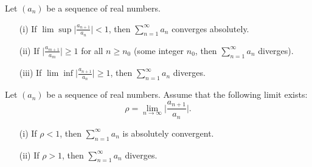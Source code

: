 \documentclass[a4paper]{article}
\begin{document}
\begin{theorem}
    Let \( ({a}_{n}) \) be a sequence of real numbers.
    \begin{enumerate}
        \item[(i)] If \( \lim \sup \Big| \frac{ {a}_{n+1} }{ {a}_{n} }  \Big|  < 1  \), then \( \sum_{ n=1  }^{ \infty  } {a}_{n} \) converges absolutely.
        \item[(ii)] If \( \Big|  \frac{ {a}_{m+1} }{ {a}_{m} }   \Big| \geq 1  \) for all \( n \geq {n}_{0} \) (some integer \( {n}_{0} \), then \( \sum_{ n=1  }^{ \infty  } {a}_{n}\) diverges).
        \item[(iii)] If \( \lim \inf \Big|  \frac{ {a}_{n+1} }{ {a}_{n} }  \Big|  \geq  1  \), then \( \sum_{ n=1  }^{ \infty  } {a}_{n} \) diverges.
    \end{enumerate}
\end{theorem}
\begin{theorem}
    Let \( ({a}_{n}) \) be a sequence of real numbers. Assume that the following limit exists:
    \[  \rho = \lim_{ n \to \infty  }  \Big|  \frac{ {a}_{n+1} }{ {a}_{n} }  \Big|. \]
    \begin{enumerate}
        \item[(i)] If \( \rho < 1 \), then \( \sum_{ n=1  }^{ \infty  } {a}_{n} \) is absolutely convergent.
        \item[(ii)] If \( \rho > 1 \), then \( \sum_{ n=1  }^{ \infty  } {a}_{n} \) diverges.
    \end{enumerate}
\end{theorem}
\end{document}
